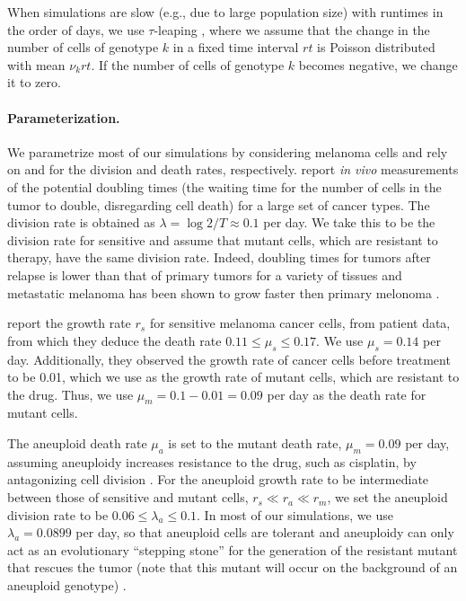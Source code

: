 \documentclass[12pt]{extarticle}
\renewcommand{\Delta}{r}
\begin{document}
When simulations are slow (e.g., due to large population size) with runtimes in the order of days, we use $\tau$-leaping \citep{gillespie2001approximate}, where we assume that the change in the number of cells of genotype $k$ in a fixed time interval $\Delta t$ is Poisson distributed with mean $\nu_k \Delta t$. If the number of cells of genotype $k$ becomes negative, we change it to zero. 


\paragraph{Parameterization.}
We parametrize most of our simulations by considering melanoma cells and rely on \citet{rew2000cell} and \citet{bozic2013evolutionary} for the division and death rates, respectively. 
\citet{rew2000cell} report \textit{in vivo} measurements of the potential doubling times (the waiting time for the number of cells in the tumor to double, disregarding cell death) for a large set of cancer types. The division rate is obtained as $\lambda=\log{2} / T \approx 0.1$ per day. We take this to be the division rate for sensitive and assume that mutant cells, which are resistant to therapy, have the same division rate. Indeed, doubling times for tumors after relapse is lower than that of primary tumors for a variety of tissues \citep{tezuka2007growth,rodgers2024glioblastoma} and metastatic melanoma has been shown to grow faster then primary melonoma \citep{carlson2003tumor}. %

\citet{bozic2013evolutionary} report the growth rate $\Delta_s$ for sensitive melanoma cancer cells, from patient data, from which they deduce the death rate $0.11 \le \mu_s \le 0.17$. We use  $\mu_s=0.14$ per day. Additionally, they observed the growth rate of cancer cells before treatment to be 0.01, which we use as the growth rate of mutant cells, which are resistant to the drug. Thus, we use $\mu_m=0.1-0.01=0.09$ per day as the death rate for mutant cells. %

The aneuploid death rate $\mu_a$ is set to the mutant death rate, $\mu_m=0.09$ per day, assuming aneuploidy increases resistance to the drug, such as cisplatin, by antagonizing cell division \citep{replogle2020aneuploidy}.
For the aneuploid growth rate to be intermediate between those of sensitive and mutant cells, $\Delta_s\ll\Delta_a\ll\Delta_m$, we set the aneuploid division rate to be $0.06 \le \lambda_a \le 0.1$. %
In most of our simulations, we use $\lambda_a=0.0899$ per day, so that aneuploid cells are tolerant and aneuploidy can only act as an evolutionary ``stepping stone'' for the generation of the resistant mutant that rescues the tumor (note that this mutant will occur on the background of an aneuploid genotype) .  
\end{document}
